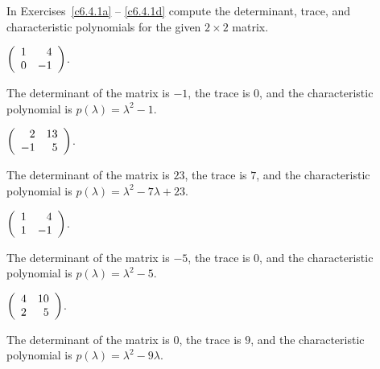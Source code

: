 \documentclass{ximera}
\begin{document}
\noindent In Exercises~\ref{c6.4.1a} -- \ref{c6.4.1d} compute the
determinant, trace, and characteristic polynomials for the given 
$2\times 2$ matrix.
\begin{exercise} \label{c6.4.1a}
$\left(\begin{array}{rr} 1 & 4\\ 0 &-1\end{array}\right)$.

\begin{solution}
The determinant of the matrix is $-1$, the trace is $0$, and
the characteristic polynomial is $p(\lambda)=\lambda^2-1$.

\end{solution}
\end{exercise}
\begin{exercise} \label{c6.4.1b}
$\left(\begin{array}{rr} 2 & 13\\ -1 &5\end{array}\right)$.

\begin{solution}
The determinant of the matrix is $23$, the trace is $7$, and
the characteristic polynomial is $p(\lambda)=\lambda^2-7\lambda+23$.

\end{solution}
\end{exercise}
\begin{exercise} \label{c6.4.1c}
$\left(\begin{array}{rr} 1 & 4\\ 1 &-1\end{array}\right)$.

\begin{solution}
\soln
The determinant of the matrix is $-5$, the trace is $0$, and
the characteristic polynomial is $p(\lambda)=\lambda^2-5$.

\end{solution}
\end{exercise}
\begin{exercise} \label{c6.4.1d}
$\left(\begin{array}{rr} 4 & 10\\ 2 &5\end{array}\right)$.

\begin{solution}
The determinant of the matrix is $0$, the trace is $9$, and
the characteristic polynomial is $p(\lambda)=\lambda^2-9\lambda$.

\end{solution}
\end{exercise}
\end{document}
